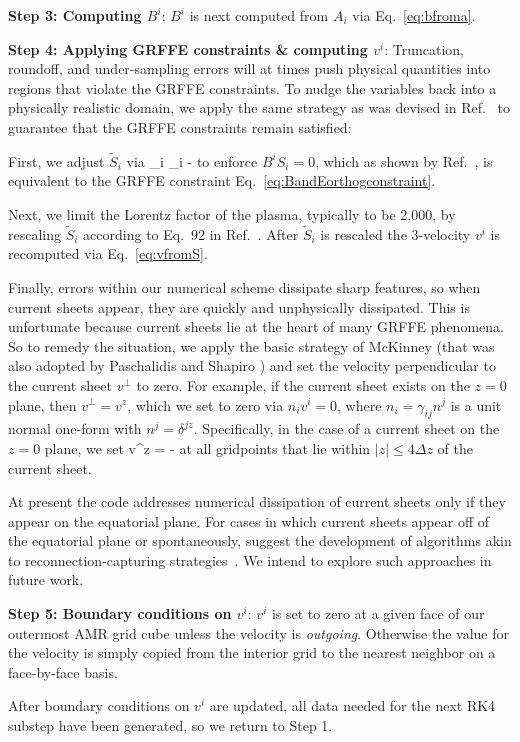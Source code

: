 {\bf Step 3: Computing $B^i$}: $B^i$ is next computed from $A_i$ via
Eq.~\ref{eq:bfroma}.

{\bf Step 4: Applying GRFFE constraints \& computing $v^i$}:
Truncation, roundoff, and under-sampling errors will at times push
physical quantities into regions that violate the GRFFE
constraints. To nudge the variables back into a physically realistic
domain, we apply the same strategy as was devised in
Ref.~\cite{Paschalidis:2013} to guarantee that the GRFFE constraints
remain satisfied:

First, we adjust $\tilde{S}_i$ via
\beq
{}_i \to {}_i - 
\eeq
to enforce $B^i S_i=0$, which as shown by Ref.~\cite{Paschalidis:2013}, is
equivalent to the GRFFE constraint Eq.~\ref{eq:BandEorthogconstraint}.

Next, we limit the Lorentz factor of the plasma, typically to be
2,000, by rescaling $\tilde{S}_i$ according to Eq.~92 in
Ref.~\cite{Paschalidis:2013}. After $\tilde{S}_i$ is rescaled the
3-velocity $v^i$ is recomputed via Eq.~\ref{eq:vfromS}.

Finally, errors within our numerical scheme dissipate
sharp features, so when current sheets appear, they are quickly
and unphysically dissipated. This is unfortunate because current
sheets lie at the heart of many GRFFE phenomena. So to remedy the
situation, we apply the basic strategy of McKinney
\cite{McKinney:2006} (that was also adopted by Paschalidis and Shapiro 
\cite{Paschalidis:2013}) and set the velocity perpendicular to the
current sheet $v^\perp$ to zero. For example, if the current sheet
exists on the $z=0$ plane, then $v^\perp=v^z$, which we set to zero
via $n_i v^i=0$, where $n_i=\gamma_{ij} n^j$ is a unit normal one-form
with $n^j=\delta^{jz}$. Specifically, in the case of a current sheet
on the $z=0$ plane, we set
\beq
v^z = -
\eeq
at all gridpoints that lie within $|z|\le 4\Delta z$ of the current
sheet.

At present the code addresses numerical dissipation of current
sheets only if they appear on the equatorial plane. For cases in which
current sheets appear off of the equatorial plane or spontaneously,
\cite{McKinney:2006} suggest the development of algorithms akin to
reconnection-capturing
strategies~\cite{StonePringle2001MNRAS.322..461S}. We intend to
explore such approaches in future work.

{\bf Step 5: Boundary conditions on $v^i$}: $v^i$ is set to zero at a
given face of our outermost AMR grid cube unless the velocity is {\it
  outgoing}. Otherwise the value for the velocity is simply copied
from the interior grid to the nearest neighbor on a face-by-face
basis.

After boundary conditions on $v^i$ are updated, all data needed for
the next RK4 substep have been generated, so we return to Step 1.







